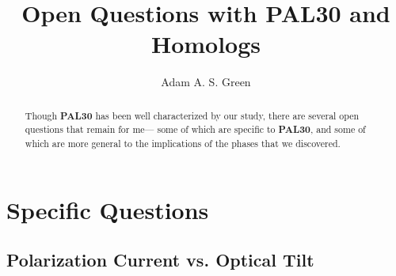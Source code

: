 \documentclass{tufte-handout}
\title{Open Questions with PAL30 and Homologs}
\author{Adam A. S. Green}
\date{}
\begin{document}

\newcommand{\leo}[1]{Professor Leo Radzihovsky}

\newcommand{\smapr}{$\mathrm{SmAP}_\mathrm{R}$}
\newcommand{\sma}{$\mathrm{SmA}$}
\newcommand{\smc}{$\mathrm{SmC}$}
\newcommand{\smapf}{$\mathrm{SmAP}_\mathrm{F}$}
\newcommand{\smapa}{$\mathrm{SmAP}_\mathrm{A}$}
\newcommand{\smcapalp}{$\mathrm{SmC}_\textrm{A}\textrm{P}_\mathrm{\alpha}$}
\newcommand{\smapalp}{$\mathrm{SmAP}_\mathrm{\alpha}$}
\newcommand{\smcapf}{$\mathrm{SmC}_\textrm{A}\textrm{P}_\mathrm{F}$}
\newcommand{\smcspf}{$\mathrm{SmC}_\textrm{S}\textrm{P}_\mathrm{F}$}
\newcommand{\smcspa}{$\mathrm{SmC}_\textrm{S}\textrm{P}_\mathrm{A}$}
\newcommand{\smcapa}{$\mathrm{SmC}_\textrm{A}\textrm{P}_\mathrm{A}$}
\newcommand{\smca}{$\mathrm{SmC}_\textrm{A}$}
\newcommand{\smcs}{$\mathrm{SmC}_\textrm{S}$}
\newcommand{\smcapaprime}{$\mathrm{SmC}_\textrm{A}\textrm{P}_\mathrm{A'}$}
\newcommand{\smaprM}{\mathrm{SmAP}_\mathrm{R}}
\newcommand{\smaM}{\mathrm{SmA}}
\newcommand{\smapfM}{\mathrm{SmAP}_\mathrm{F}}
\newcommand{\smapaM}{\mathrm{SmAP}_\mathrm{A}}
\newcommand{\smapalpM}{\mathrm{SmAP}_\mathrm{\alpha}}
\newcommand{\smcapfM}{\mathrm{SmC}_\textrm{A}\textrm{P}_\mathrm{F}}
\newcommand{\smcspfM}{\mathrm{SmC}_\textrm{S}\textrm{P}_\mathrm{F}}
\newcommand{\smcspaM}{\mathrm{SmC}_\textrm{S}\textrm{P}_\mathrm{A}}
\newcommand{\smcapaM}{\mathrm{SmC}_\textrm{A}\textrm{P}_\mathrm{A}}

\newcommand{\smcsM}{\mathrm{SmC}_\textrm{S}}
\newcommand{\smcapaprimeM}{\mathrm{SmC}_\textrm{A}\textrm{P}_\mathrm{A`}}

\newcommand{\nsix}{\textbf{n-16}}
\newcommand{\nfour}{\textbf{PAL30}}
\maketitle

\begin{abstract}
\noindent 
Though \nfour{} has been well characterized by our study, there are several
open questions that remain for me--- some of which are specific to \nfour{},
and some of which are more general to the implications of the phases that we
discovered.
\end{abstract}
\section{Specific Questions}
\subsection{Polarization Current vs. Optical Tilt}
\end{document}
